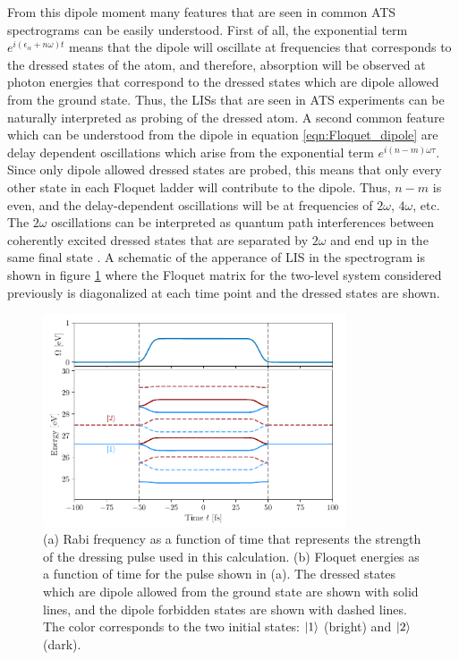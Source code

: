 From this dipole moment many features that are seen in common ATS spectrograms can be easily understood.  First of all, the exponential term $e^{i(\epsilon_\alpha+n\omega)t}$ means that the dipole will oscillate at frequencies that corresponds to the dressed states of the atom, and therefore, absorption will be observed at photon energies that correspond to the dressed states which are dipole allowed from the ground state. Thus, the LISs that are seen in ATS experiments can be naturally interpreted as probing of the dressed atom.   A second common feature which can be understood from the dipole in equation \ref{eqn:Floquet_dipole} are delay dependent oscillations which arise from the exponential term $e^{i(n-m)\omega\tau}$.  Since only dipole allowed dressed states are probed, this means that only every other state in each  Floquet ladder will contribute to the dipole.  Thus, $n-m$ is even, and the delay-dependent oscillations will be at frequencies of $2\omega$, $4\omega$, etc.  The $2\omega$ oscillations can be interpreted as quantum path interferences between coherently excited dressed states that are separated by $2\omega$ and end up in the same final state \cite{chenQuantumInterferenceAttosecond2013}.  A schematic of the apperance of LIS in the spectrogram is shown in figure \ref{fig:floquet_energies_time_dep} where the Floquet matrix for the two-level system considered previously is diagonalized at each time point and the dressed states are shown.

\begin{figure}
	\centering
	\includegraphics[width=0.8\textwidth]{figures/ATS/floquet_energies_time_dep.pdf}
	\caption[Floquet energies as a function of Rabi frequency and time.]{(a) Rabi frequency as a function of time that represents the strength of the dressing pulse used in this calculation.  (b) Floquet energies as a function of time for the pulse shown in (a). The dressed states which are dipole allowed from the ground state are shown with solid lines, and the dipole forbidden states are shown with dashed lines.  The color corresponds to the two initial states: $\ket{1}$ (bright) and $\ket{2}$ (dark).}
	\label{fig:floquet_energies_time_dep}
\end{figure}



